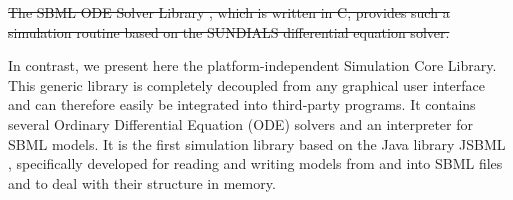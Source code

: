 \documentclass{bioinfo}
\begin{document}
\sout{The SBML ODE Solver Library \citep{Machne2006}, which is written in C,
provides such a simulation routine based on the SUNDIALS differential equation
solver.}

In contrast, we present here the platform-independent Simulation Core
Library. This generic library is completely decoupled from any graphical user
interface and can therefore easily be integrated into third-party programs. 
It contains several Ordinary Differential Equation (ODE)
solvers and an interpreter for SBML models. It is the first simulation library
 based on the Java library JSBML \citep{Draeger2011b}, specifically
developed for reading and writing models from and into SBML
files and to deal with their structure in memory.

\end{document}
